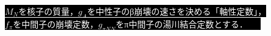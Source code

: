 \documentclass[uplatex]{jsarticle}
\title{}
\date{\today}
\begin{document}
\noindent
\colorbox{black}{\textcolor{white}{$M_N$を核子の質量，$g_A$を中性子のβ崩壊の速さを決める「軸性定数」，}}\\[-1mm]
\colorbox{black}{\textcolor{white}{$f_{\pi}$を中間子の崩壊定数，$g_{\pi NN}$をπ中間子の湯川結合定数とする．　　\\}}
\end{document}
